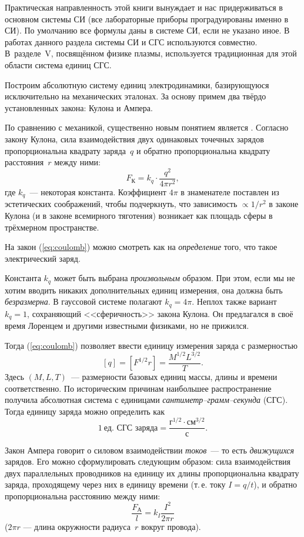 Практическая направленность этой книги вынуждает и нас придерживаться
в основном системы СИ (все лабораторные приборы проградуированы именно в СИ).
По умолчанию все формулы даны в системе СИ, если не указано иное. 
В работах данного раздела системы СИ и СГС используются совместно. 
В~разделе~V, посвящённом физике плазмы, используется традиционная для 
этой области система единиц СГС.


Построим абсолютную систему единиц электродинамики, базирующуюся исключительно
на механических эталонах. За основу примем два твёрдо установленных
закона: Кулона и Ампера.

По сравнению с механикой, существенно новым понятием является . Согласно закону Кулона, сила взаимодействия двух одинаковых
точечных зарядов пропорциональна квадрату заряда~$q$ и обратно пропорциональна
квадрату расстояния~$r$ между ними:
\begin{equation}
F_{\text{К}}=k_{q}\cdot\frac{q^{2}}{4\pi r^{2}},\label{eq:coulomb}
\end{equation}
где $k_{q}$~--- некоторая константа. Коэффициент $4\pi$ в знаменателе
поставлен из эстетических соображений,
чтобы подчеркнуть, что зависимость $\propto1/r^{2}$ в законе Кулона
(и в законе всемирного тяготения) возникает как площадь сферы в трёхмерном
пространстве.

На закон (\ref{eq:coulomb}) можно смотреть как на \emph{определение}
того, что такое электрический заряд.

Константа $k_{q}$ может быть выбрана \emph{произвольным} образом.
При этом, если мы не хотим вводить никаких дополнительных единиц измерения,
она должна быть \emph{безразмерна}. В гауссовой системе
полагают $k_{q}=4\pi$. Неплох также вариант $k_{q}=1$, сохраняющий
<<сферичность>> закона Кулона. Он предлагался в своё время
Лоренцем и другими известными физиками, но не прижился.

Тогда (\ref{eq:coulomb}) позволяет ввести единицу измерения заряда
с размерностью
\[
\left[q\right]=[F^{1/2}r]=\frac{M^{1/2}L^{3/2}}{T}.
\]
Здесь $\left(M,L,T\right)$~--- размерности базовых единиц массы,
длины и времени соответственно. По историческим причинам наибольшее
распространение получила абсолютная система с единицами \emph{сантиметр--грамм--секунда}
(СГС). Тогда единицу заряда можно определить как
\[
1~\text{ед. СГС заряда}=\frac{\text{г}^{1/2}\cdot\text{см}^{3/2}}{\text{с}}.
\]

Закон Ампера говорит о силовом взаимодействии \emph{токов}~--- то
есть \emph{движущихся} зарядов. Его можно сформулировать следующим
образом: сила взаимодействия двух параллельных проводников на единицу их длины
пропорциональна квадрату заряда, проходящему через них в единицу времени
(т.\,е. току $I=q/t$), и обратно пропорциональна расстоянию между ними:
\begin{equation}
\frac{F_{\text{А}}}{l}=k_{I}\frac{I^{2}}{2\pi r}\label{eq:ampere}
\end{equation}
($2\pi r$ --- длина окружности радиуса~$r$ вокруг провода).

